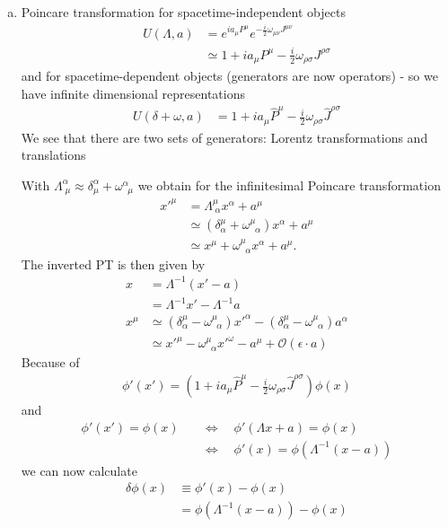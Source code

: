 \documentclass[10pt,a4paper]{report}
\theoremstyle{definition}
\begin{document}
\begin{enumerate}[a)]
\item Poincare transformation for spacetime-independent objects 
\begin{align}
U(\Lambda,a)&=e^{ia_\mu P^\mu}e^{-\frac{i}{2}\omega_{\mu\nu} J^{\mu\nu}}\\
&\simeq1+ia_\mu {P}^\mu-\frac{i}{2}\omega_{\rho\sigma}{J}^{\rho\sigma}
\end{align}
and for spacetime-dependent objects (generators are now operators) - so we have infinite dimensional representations
\begin{align}
U(\delta+\omega,a)
&=1+ia_\mu \hat{P}^\mu-\frac{i}{2}\omega_{\rho\sigma}\hat{J}^{\rho\sigma}
\end{align}
We see that there are two sets of generators: Lorentz transformations and translations

With $\Lambda^\alpha_{\;\mu}\approx\delta^\alpha_\mu+\omega^\alpha_{\;\;\mu}$ we obtain for the infinitesimal Poincare transformation
\begin{align}
x'^\mu
&=\Lambda^\mu_{\;\alpha}x^\alpha+a^\mu\\
&\simeq\left(\delta^\mu_\alpha+\omega^\mu_{\;\;\alpha}\right)x^\alpha+a^\mu\\
&\simeq x^\mu+\omega^\mu_{\;\;\alpha}x^\alpha+a^\mu.
\end{align}
The inverted PT is then given by
\begin{align}
x&=\Lambda^{-1}(x'-a)\\
&=\Lambda^{-1}x'-\Lambda^{-1}a\\
x^\mu&\simeq\left(\delta^\mu_\alpha-\omega^\mu_{\;\;\alpha}\right)x'^\alpha-\left(\delta^\mu_\alpha-\omega^\mu_{\;\;\alpha}\right)a^\alpha\\
&\simeq x'^\mu-\omega^\mu_{\;\;\alpha}x'^\omega-a^\mu+\mathcal{O}(\epsilon\cdot a)
\end{align}
Because of 
\begin{align}
\phi'(x')=\left(1+ia_\mu\hat{P}^\mu-\frac{i}{2}\omega_{\rho\sigma}\hat{J}^{\rho\sigma}\right)\phi(x)
\end{align}
and
\begin{align}
\phi'(x')=\phi(x)
&\quad\Leftrightarrow\quad\phi'(\Lambda x+a)=\phi(x)\\
&\quad\Leftrightarrow\quad\phi'(x)=\phi(\Lambda^{-1}(x-a))
\end{align}
we can now calculate 
\begin{align}
\delta\phi(x)
&\equiv\phi'(x)-\phi(x)\\
&=\phi(\Lambda^{-1}(x-a))-\phi(x)\\

\end{align}
\end{enumerate}
\end{document}
